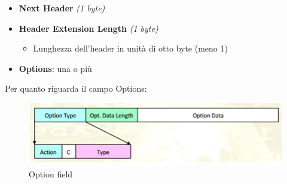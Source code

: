 \documentclass{article}
\begin{document}
\begin{itemize}
    \item \textbf{Next Header} \textit{(1 byte)}
    \item \textbf{Header Extension Length} \textit{(1 byte)}
    \begin{itemize}
        \item Lunghezza dell’header in unità di otto byte (meno 1)
    \end{itemize}
    \item \textbf{Options}: una o più
\end{itemize}

Per quanto riguarda il campo Options:
\begin{figure}[H]
\centering
\includegraphics[scale=0.5]{figures/option field.png}
\caption{Option field}
\end{figure}
\end{document}
